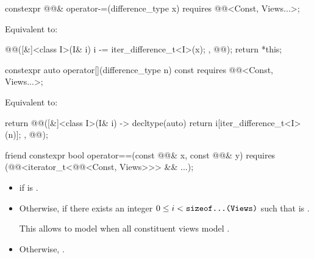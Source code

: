 \begin{itemdecl}
constexpr @@& operator-=(difference_type x)
  requires @@<Const, Views...>;
\end{itemdecl}

\begin{itemdescr}
\pnum
\effects
Equivalent to:
\begin{codeblock}
@@([&]<class I>(I& i) { i -= iter_difference_t<I>(x); }, @@);
return *this;
\end{codeblock}
\end{itemdescr}

\begin{itemdecl}
constexpr auto operator[](difference_type n) const
  requires @@<Const, Views...>;
\end{itemdecl}

\begin{itemdescr}
\pnum
\effects
Equivalent to:
\begin{codeblock}
return @@([&]<class I>(I& i) -> decltype(auto) {
  return i[iter_difference_t<I>(n)];
}, @@);
\end{codeblock}
\end{itemdescr}

\begin{itemdecl}
friend constexpr bool operator==(const @@& x, const @@& y)
  requires (@@<iterator_t<@@<Const, Views>>> && ...);
\end{itemdecl}

\begin{itemdescr}
\pnum
\returns
\begin{itemize}
\item
{}
if  is .
\item
Otherwise, 
if there exists an integer $0 \leq i < \texttt{\protect sizeof...(Views)}$
such that  is .
\begin{note}
This allows  to model 
when all constituent views model .
\end{note}
\item
Otherwise, .
\end{itemize}
\end{itemdescr}

